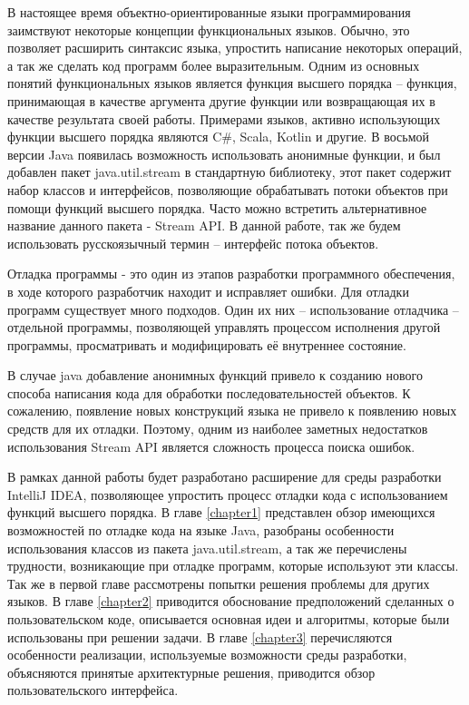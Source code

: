 В настоящее время объектно-ориентированные языки программирования заимствуют некоторые концепции функциональных языков.  Обычно, это позволяет расширить синтаксис языка, упростить написание некоторых операций, а так же сделать код программ более выразительным. Одним из основных понятий функциональных языков является функция высшего порядка -- функция, принимающая в качестве аргумента другие функции или возвращающая их в качестве результата своей работы. Примерами языков, активно использующих функции высшего порядка являются C\#, Scala, Kotlin и другие. В восьмой версии Java появилась возможность использовать анонимные функции, и был добавлен пакет java.util.stream в стандартную библиотеку, этот пакет содержит набор классов и интерфейсов, позволяющие обрабатывать потоки объектов при помощи функций высшего порядка. Часто можно встретить альтернативное название данного пакета - Stream API. В данной работе, так же будем использовать русскоязычный термин -- интерфейс потока объектов.

Отладка программы - это один из этапов разработки программного обеспечения, в ходе которого разработчик находит и исправляет ошибки. Для отладки программ существует много подходов. Один их них -- использование отладчика -- отдельной программы, позволяющей управлять процессом исполнения другой программы, просматривать и модифицировать её внутреннее состояние.

В случае java добавление анонимных функций привело к созданию нового способа написания кода для обработки последовательностей объектов. К сожалению, появление новых конструкций языка не привело к появлению новых средств для их отладки. Поэтому, одним из наиболее заметных недостатков использования Stream API является сложность процесса поиска ошибок.

В рамках данной работы будет разработано расширение для среды разработки IntelliJ IDEA, позволяющее упростить процесс отладки кода с использованием функций высшего порядка. В главе \ref{chapter1} представлен обзор имеющихся возможностей по отладке кода на языке Java, разобраны особенности использования классов из пакета java.util.stream, а так же перечислены трудности, возникающие при отладке программ, которые используют эти классы. Так же в первой главе рассмотрены попытки решения проблемы для других языков. В главе \ref{chapter2} приводится обоснование предположений сделанных о пользовательском коде, описывается основная идеи и алгоритмы, которые были использованы при решении задачи. В главе \ref{chapter3} перечисляются особенности реализации, используемые возможности среды разработки, объясняются принятые архитектурные решения, приводится обзор пользовательского интерфейса.

